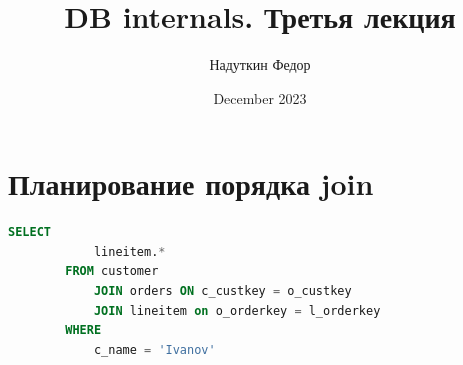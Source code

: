 \documentclass[11pt]{article}
\title{DB internals. Третья лекция}
\author{Надуткин Федор }
\date{December 2023}
\begin{document}
    \maketitle
    \newpage
    \section*{Планирование порядка join}


    \begin{lstlisting}[language=SQL,
        label={lst:join_problem},
        caption={Пример проблемного Join}]
        SELECT
            lineitem.*
        FROM customer
            JOIN orders ON c_custkey = o_custkey
            JOIN lineitem on o_orderkey = l_orderkey
        WHERE
            c_name = 'Ivanov'
    \end{lstlisting}
\end{document}
